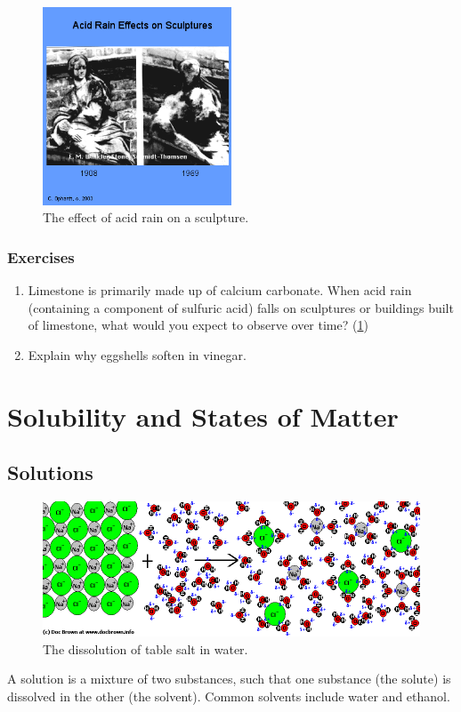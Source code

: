 \documentclass[a4paper]{memoir}
\begin{document}
\begin{figure}
  \centering
  \includegraphics[width=0.5\textwidth]{acidrain}
  \caption{The effect of acid rain on a sculpture.\label{fig:acidrain}}
\end{figure}

\subsection*{Exercises}
\begin{enumerate}
  \item Limestone is primarily made up of calcium carbonate. When acid rain (containing a component of sulfuric acid) falls on sculptures or buildings built
        of limestone, what would you expect to observe over time? (\cref{fig:acidrain})
  \item Explain why eggshells soften in vinegar.
\end{enumerate}


\chapter{Solubility and States of Matter}
\section{Solutions}
\begin{figure}
  \centering
  \includegraphics[width=\textwidth]{dissolving}
  \caption{The dissolution of table salt in water.\label{fig:dissolving}}
\end{figure}
A solution is a mixture of two substances, such that one substance (the solute) is dissolved in the other (the solvent). Common solvents
include water and ethanol.
\end{document}
